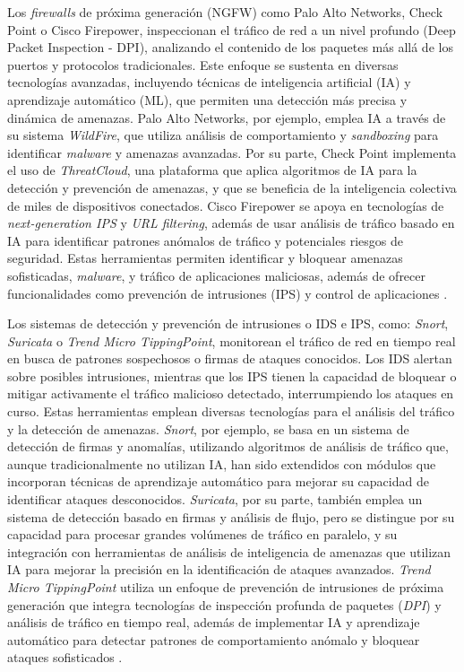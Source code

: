 Los \textit{firewalls} de próxima generación (NGFW) como Palo Alto Networks, Check Point o Cisco Firepower, inspeccionan el tráfico de red a un nivel profundo (Deep Packet Inspection - DPI), analizando el contenido de los paquetes más allá de los puertos y protocolos tradicionales. Este enfoque se sustenta en diversas tecnologías avanzadas, incluyendo técnicas de inteligencia artificial (IA) y aprendizaje automático (ML), que permiten una detección más precisa y dinámica de amenazas. Palo Alto Networks, por ejemplo, emplea IA a través de su sistema \textit{WildFire}, que utiliza análisis de comportamiento y \textit{sandboxing} para identificar \textit{malware} y amenazas avanzadas. Por su parte, Check Point implementa el uso de \textit{ThreatCloud}, una plataforma que aplica algoritmos de IA para la detección y prevención de amenazas, y que se beneficia de la inteligencia colectiva de miles de dispositivos conectados. Cisco Firepower se apoya en tecnologías de \textit{next-generation IPS} y \textit{URL filtering}, además de usar análisis de tráfico basado en IA para identificar patrones anómalos de tráfico y potenciales riesgos de seguridad. Estas herramientas permiten identificar y bloquear amenazas sofisticadas, \textit{malware}, y tráfico de aplicaciones maliciosas, además de ofrecer funcionalidades como prevención de intrusiones (IPS) y control de aplicaciones \cite{cosmikal_firewall}.


Los sistemas de detección y prevención de intrusiones o IDS e IPS, como: \textit{Snort}, \textit{Suricata} o \textit{Trend Micro TippingPoint}, monitorean el tráfico de red en tiempo real en busca de patrones sospechosos o firmas de ataques conocidos. Los IDS alertan sobre posibles intrusiones, mientras que los IPS tienen la capacidad de bloquear o mitigar activamente el tráfico malicioso detectado, interrumpiendo los ataques en curso. Estas herramientas emplean diversas tecnologías para el análisis del tráfico y la detección de amenazas. \textit{Snort}, por ejemplo, se basa en un sistema de detección de firmas y anomalías, utilizando algoritmos de análisis de tráfico que, aunque tradicionalmente no utilizan IA, han sido extendidos con módulos que incorporan técnicas de aprendizaje automático para mejorar su capacidad de identificar ataques desconocidos. \textit{Suricata}, por su parte, también emplea un sistema de detección basado en firmas y análisis de flujo, pero se distingue por su capacidad para procesar grandes volúmenes de tráfico en paralelo, y su integración con herramientas de análisis de inteligencia de amenazas que utilizan IA para mejorar la precisión en la identificación de ataques avanzados. \textit{Trend Micro TippingPoint} utiliza un enfoque de prevención de intrusiones de próxima generación que integra tecnologías de inspección profunda de paquetes (\textit{DPI}) y análisis de tráfico en tiempo real, además de implementar IA y aprendizaje automático para detectar patrones de comportamiento anómalo y bloquear ataques sofisticados \cite{geekflare_ids_ips}.

